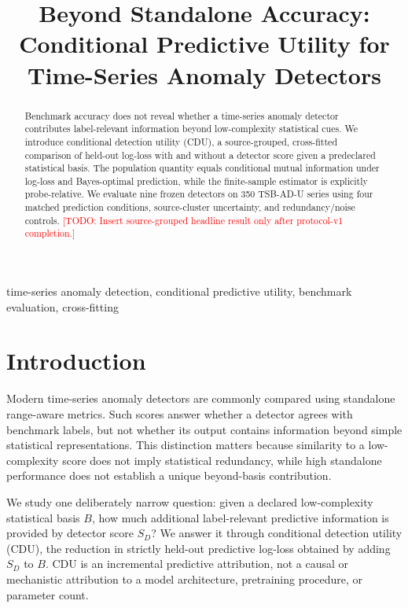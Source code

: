 \documentclass[conference]{IEEEtran}
\title{Beyond Standalone Accuracy: Conditional Predictive Utility for Time-Series Anomaly Detectors}
\author{\IEEEauthorblockN{Anonymous Authors}}
\newcommand{\todo}[1]{\textcolor{red}{[TODO: #1]}}
\begin{document}
\maketitle

\begin{abstract}
Benchmark accuracy does not reveal whether a time-series anomaly detector contributes label-relevant information beyond low-complexity statistical cues. We introduce conditional detection utility (CDU), a source-grouped, cross-fitted comparison of held-out log-loss with and without a detector score given a predeclared statistical basis. The population quantity equals conditional mutual information under log-loss and Bayes-optimal prediction, while the finite-sample estimator is explicitly probe-relative. We evaluate nine frozen detectors on 350 TSB-AD-U series using four matched prediction conditions, source-cluster uncertainty, and redundancy/noise controls. \todo{Insert source-grouped headline result only after protocol-v1 completion.}
\end{abstract}

\begin{IEEEkeywords}
time-series anomaly detection, conditional predictive utility, benchmark evaluation, cross-fitting
\end{IEEEkeywords}

\section{Introduction}
Modern time-series anomaly detectors are commonly compared using standalone range-aware metrics. Such scores answer whether a detector agrees with benchmark labels, but not whether its output contains information beyond simple statistical representations. This distinction matters because similarity to a low-complexity score does not imply statistical redundancy, while high standalone performance does not establish a unique beyond-basis contribution.

We study one deliberately narrow question: given a declared low-complexity statistical basis $B$, how much additional label-relevant predictive information is provided by detector score $S_D$? We answer it through conditional detection utility (CDU), the reduction in strictly held-out predictive log-loss obtained by adding $S_D$ to $B$. CDU is an incremental predictive attribution, not a causal or mechanistic attribution to a model architecture, pretraining procedure, or parameter count.
\end{document}

